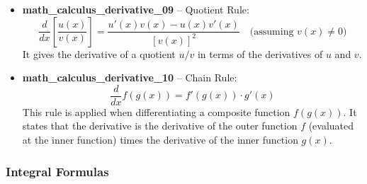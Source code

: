 \documentclass[11pt,a4paper]{article}
\begin{document}
\begin{itemize}
\item \textbf{math\_calculus\_derivative\_09} -- Quotient Rule: 
\[\frac{d}{dx}\left[\frac{u(x)}{v(x)}\right] = \frac{u'(x)v(x) - u(x)v'(x)}{[v(x)]^2} \quad \text{(assuming } v(x)\neq 0\text{)}\]
It gives the derivative of a quotient $u/v$ in terms of the derivatives of $u$ and $v$.

\item \textbf{math\_calculus\_derivative\_10} -- Chain Rule: 
\[\frac{d}{dx}f(g(x)) = f'(g(x)) \cdot g'(x)\]
This rule is applied when differentiating a composite function $f(g(x))$. It states that the derivative is the derivative of the outer function $f$ (evaluated at the inner function) times the derivative of the inner function $g(x)$.
\end{itemize}

\subsubsection{Integral Formulas}
\end{document}
